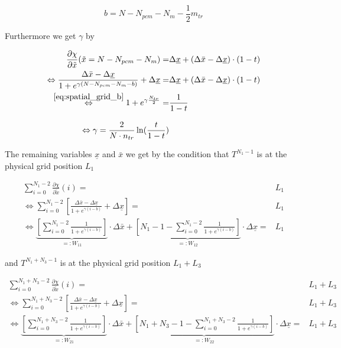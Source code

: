 \documentclass{scrartcl}[12pt, halfparskip]
\begin{document}
\begin{equation}
	b = N - N_{pcm} - N_m - \frac{1}{2} m_{tr}
	\label{eq:spatial_grid_b}
\end{equation}

Furthermore we get $\gamma$ by

\begin{subequations}
\begin{align}
	\frac{\partial \chi}{\partial \tilde{x}}(\tilde{x}=N-N_{pcm}-N_m) = & \Delta \underline{x} + (\Delta \bar{x} - \Delta \underline{x}) \cdot (1-t) \\
	\Leftrightarrow \frac{\Delta \bar{x} - \Delta \underline{x}}{1 + e^{\gamma(N-N_{pcm}-N_m - b)}} + \Delta \underline{x} = & \Delta \underline{x} + (\Delta \bar{x} - \Delta \underline{x}) \cdot (1-t)  \\
	\stackrel{\eqref{eq:spatial_grid_b}}{\Leftrightarrow}  1 + e^{\gamma \frac{N_{tr}}{2}} = & \frac{1}{1 - t}  \\[2ex]
	\Leftrightarrow \gamma = \frac{2}{N \cdot n_{tr}} \ln(\frac{t}{1-t})
\end{align}
\end{subequations}

The remaining variables $\underline{x}$ and $\bar{x}$ we get by the condition that $T^{N_1-1}$ is at the physical grid position $L_1$

\begin{subequations}
	\begin{align}
	\sum_{i=0}^{N_1 - 2} \frac{\partial \chi}{\partial \tilde{x}}(i) = & L_1 \\
	\Leftrightarrow \sum_{i=0}^{N_1 - 2} \left[ \frac{\Delta \bar{x} - \Delta \underline{x}}{1 + e^{\gamma(i - b)}} + \Delta \underline{x} \right] = & L_1 \\
	\Leftrightarrow \underbrace{ \left[ \sum_{i=0}^{N_1 - 2} \frac{1}{1 + e^{\gamma(i - b)}} \right] }_{=: W_{11}} \cdot \Delta \bar{x} + \underbrace{\left[ N_1 - 1 - \sum_{i=0}^{N_1 - 2} \frac{1}{1 + e^{\gamma(i - b)}} \right]}_{=: W_{12}} \cdot \Delta \underline{x} = & L_1
	\end{align}
\end{subequations}

and $T^{N_1+N_3-1}$ is at the physical grid position $L_1+L_3$

\begin{subequations}
	\begin{align}
	\sum_{i=0}^{N_1 + N_3 - 2} \frac{\partial \chi}{\partial \tilde{x}}(i) = & L_1 + L_3 \\
	\Leftrightarrow \sum_{i=0}^{N_1 + N_3 - 2} \left[ \frac{\Delta \bar{x} - \Delta \underline{x}}{1 + e^{\gamma(i - b)}} + \Delta \underline{x} \right] = & L_1 + L_3 \\
	\Leftrightarrow \underbrace{ \left[ \sum_{i=0}^{N_1 + N_3 - 2} \frac{1}{1 + e^{\gamma(i - b)}} \right] }_{=: W_{21}} \cdot \Delta \bar{x} + \underbrace{ \left[ N_1 + N_3 - 1 - \sum_{i=0}^{N_1 + N_3 - 2} \frac{1}{1 + e^{\gamma(i - b)}} \right] }_{=: W_{22}} \cdot \Delta \underline{x} = & L_1 + L_3
	\end{align}
\end{subequations}
\end{document}

